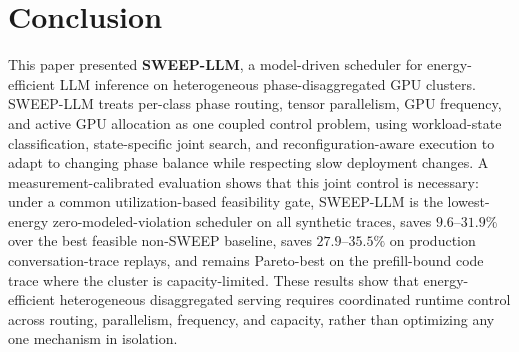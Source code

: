 \section{Conclusion}
\label{sec:conclusion}

This paper presented \textbf{SWEEP-LLM}, a model-driven scheduler for energy-efficient LLM inference on heterogeneous phase-disaggregated GPU clusters.
SWEEP-LLM treats per-class phase routing, tensor parallelism, GPU frequency, and active GPU allocation as one coupled control problem, using workload-state classification, state-specific joint search, and reconfiguration-aware execution to adapt to changing phase balance while respecting slow deployment changes.
A measurement-calibrated evaluation shows that this joint control is necessary: under a common utilization-based feasibility gate, SWEEP-LLM is the lowest-energy zero-modeled-violation scheduler on all synthetic traces, saves $9.6$--$31.9\%$ over the best feasible non-SWEEP baseline, saves $27.9$--$35.5\%$ on production conversation-trace replays, and remains Pareto-best on the prefill-bound code trace where the cluster is capacity-limited.
These results show that energy-efficient heterogeneous disaggregated serving requires coordinated runtime control across routing, parallelism, frequency, and capacity, rather than optimizing any one mechanism in isolation.
